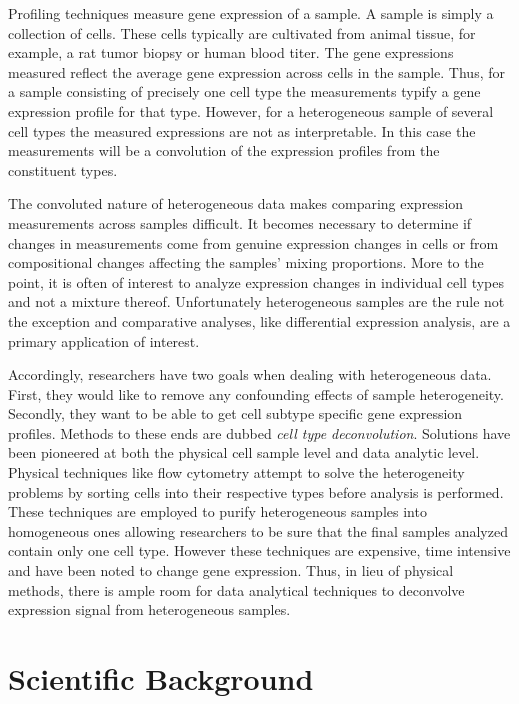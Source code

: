 \documentclass[reqno,12pt,oneside]{report}\usepackage[]{graphicx}\usepackage[]{color}
\theoremstyle{plain}
\theoremstyle{definition}
\theoremstyle{remark}
\numberwithin{theorem}{chapter}     %
\begin{document}
Profiling techniques measure gene expression of a sample. A sample is simply a collection of cells. These cells typically are cultivated from animal tissue, for example, a rat tumor biopsy or human blood titer. The gene expressions measured reflect the average gene expression across cells in the sample. Thus, for a sample consisting of precisely one cell type the measurements typify a gene expression profile for that type. However, for a heterogeneous sample of several cell types the measured expressions are not as interpretable. In this case the measurements will be a convolution of the expression profiles from the constituent types. 

The convoluted nature of heterogeneous data makes comparing expression measurements across samples difficult. It becomes necessary to determine if changes in measurements come from genuine expression changes in cells or from compositional changes affecting the samples' mixing proportions. More to the point, it is often of interest to analyze expression changes in individual cell types and not a mixture thereof. Unfortunately heterogeneous samples are the rule not the exception and comparative analyses, like differential expression analysis, are a primary application of interest.

Accordingly, researchers have two goals when dealing with heterogeneous data. First, they would like to remove any confounding effects of sample heterogeneity. Secondly, they want to be able to get cell subtype specific gene expression profiles. Methods to these ends are dubbed \emph{cell type deconvolution}. Solutions have been pioneered at both the physical cell sample level and data analytic level. Physical techniques like flow cytometry attempt to solve the heterogeneity problems by sorting cells into their respective types before analysis is performed. These techniques are employed to purify heterogeneous samples into homogeneous ones allowing researchers to be sure that the final samples analyzed contain only one cell type. However these techniques are expensive, time intensive and have been noted to change gene expression. Thus, in lieu of physical methods, there is ample room for data analytical techniques to deconvolve expression signal from heterogeneous samples. 

 

 \chapter{Scientific Background}
 \label{chap:Science}
\end{document}
